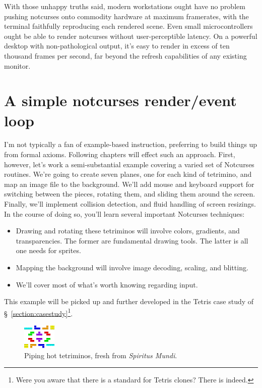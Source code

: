 \documentclass[letterpaper,10pt]{article}
\newenvironment{denseitemize}{
  \begin{itemize}
      \setlength{\itemsep}{0pt}
}{
  \end{itemize}
}
\begin{document}
With those unhappy truths said, modern workstations ought have no problem pushing
notcurses onto commodity hardware at maximum framerates, with the terminal
faithfully reproducing each rendered scene. Even small microcontrollers ought
be able to render notcurses without user-perceptible latency. On a powerful
desktop with non-pathological output, it's easy to render in excess of
ten thousand frames per second, far beyond the refresh capabilities of any
existing monitor.

\newpage

\section{A simple notcurses render\slash event loop}
I'm not typically a fan of example-based instruction, preferring to build things
up from formal axioms. Following chapters will effect such an approach. First,
however, let's work a semi-substantial example covering a varied set of
Notcurses routines. We're going to create seven planes, one for each kind
of tetrimino, and map an image file to the background. We'll add mouse and
keyboard support for switching between the pieces, rotating them, and sliding
them around the screen. Finally, we'll implement collision detection, and
fluid handling of screen resizings. In the course of doing so, you'll learn
several important Notcurses techniques:

\begin{denseitemize}
\item{Drawing and rotating these tetriminos will involve colors, gradients, and
      transparencies. The former are fundamental drawing tools. The latter is
      all one needs for sprites.}
\item{Mapping the background will involve image decoding, scaling, and blitting.}
\item{We'll cover most of what's worth knowing regarding input.}
\end{denseitemize}

This example will be picked up and further developed in the Tetris case study
of §~\ref{section:casestudy}\footnote{Were you aware that there is a standard
for Tetris clones? There is indeed\cite{tetris}.}.

\begin{figure}[!htbp]
\centering \includegraphics[width=.5\linewidth]{media/tetriminos.png}
\caption{Piping hot tetriminos, fresh from \textit{Spiritus Mundi}.}
\label{fig:tetriminos}
\end{figure}
\end{document}
